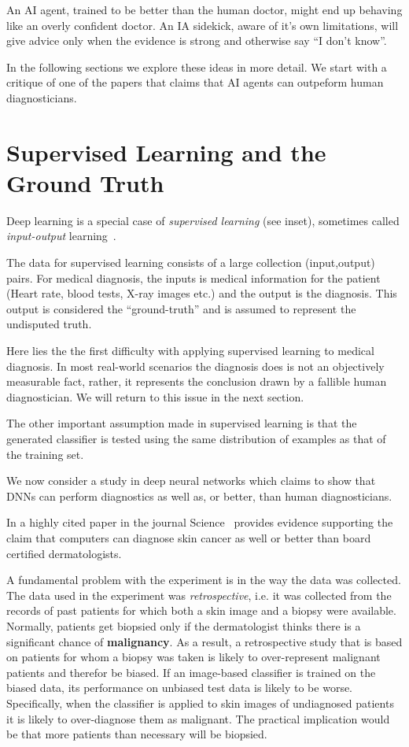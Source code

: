 \documentclass[11pt]{pnas-new}
\begin{document}
An AI agent, trained to be better than the human doctor, might end up
behaving like an overly confident doctor. An IA sidekick, aware of
it's own limitations, will give advice only when the evidence is
strong and otherwise say ``I don't know''.

In the following sections we explore these ideas in more detail. We
start with a critique of one of the papers that claims that AI agents
can outpeform human diagnosticians.

\section{Supervised Learning and the Ground Truth}
\label{sec:ground-truth}

Deep learning is a special case of {\em supervised learning} (see
inset), sometimes called {\em input-output}
learning~\cite{ng2016artificial,topol2019deep}.

The data for supervised learning consists of a large collection
(input,output) pairs. For medical diagnosis, the inputs is medical
information for the patient (Heart rate, blood tests, X-ray images
etc.) and the output is the diagnosis. This output is considered the
``ground-truth'' and is assumed to represent the undisputed truth.

Here lies the the first difficulty with applying supervised learning
to medical diagnosis. In most real-world scenarios the diagnosis
does is not an objectively measurable fact, rather, it
represents the conclusion drawn by a fallible human diagnostician. We  will
return to this issue in the next section.

The other important assumption made in supervised learning is that the
generated classifier is tested using the same distribution of examples
as that of the training set.

We now consider a study in deep neural networks which claims to show
that DNNs can perform diagnostics as well as, or better, than human diagnosticians. 

In a highly cited paper in the journal
Science~\cite{esteva2017dermatologist} provides evidence supporting
the claim that computers can diagnose skin cancer as well or better than board
certified dermatologists.

A fundamental problem with the experiment is in the way the data was
collected. The data used in the experiment was {\em retrospective},
i.e. it was collected from the records of past patients for which both
a skin image and a biopsy were available. Normally, patients get
biopsied only if the dermatologist thinks there is a significant
chance of {\bf malignancy}. As a result, a retrospective study that is
based on patients for whom a biopsy was taken is likely to
over-represent malignant patients and therefor be biased. If an image-based classifier
is trained on the biased data, its performance on unbiased test data
is likely to be worse. Specifically, when the classifier is applied to skin
images of undiagnosed patients it is likely to over-diagnose them as
malignant. The practical implication would be that more patients than
necessary will be biopsied.
\end{document}
